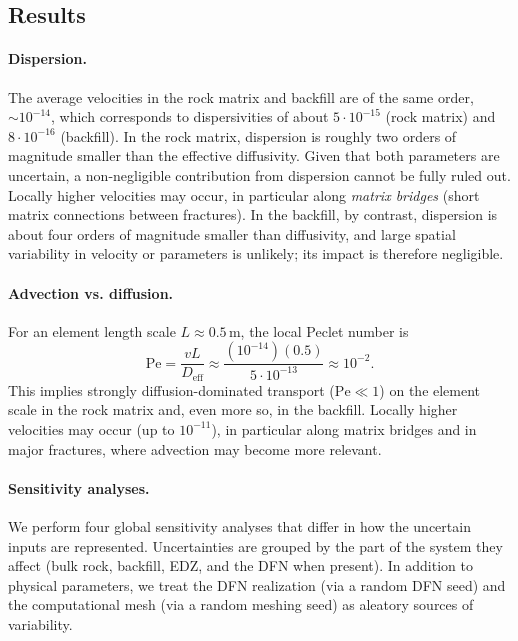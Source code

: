 \FloatBarrier







\subsection{Results}

\paragraph{Dispersion.}
The average velocities in the rock matrix and backfill are of the same order, $\sim 10^{-14}$, which corresponds to dispersivities of about $5\cdot 10^{-15}$ (rock matrix) and $8\cdot 10^{-16}$ (backfill). In the rock matrix, dispersion is roughly two orders of magnitude smaller than the effective diffusivity. 
Given that both parameters are uncertain, a non-negligible contribution from dispersion cannot be fully ruled out. Locally higher velocities may occur, in particular along \emph{matrix bridges} (short matrix connections between fractures).
In the backfill, by contrast, dispersion is about four orders of magnitude smaller than diffusivity, and large spatial variability in velocity or parameters is unlikely; its impact is therefore negligible.

\paragraph{Advection vs. diffusion.}
For an element length scale $L \approx 0.5\,\mathrm{m}$, the local Peclet number is
\[
\mathrm{Pe}=\frac{vL}{D_{\mathrm{eff}}}\approx \frac{(10^{-14})(0.5)}{5\cdot 10^{-13}} \approx 10^{-2}.
\]
This implies strongly diffusion-dominated transport ($\mathrm{Pe}\ll 1$) on the element scale in the rock matrix and, even more so, in the backfill. Locally higher velocities may occur (up to $10^{-11}$), in particular along matrix bridges and in major fractures, where advection may become more relevant.

\paragraph{Sensitivity analyses.}
We perform four global sensitivity analyses that differ in how the uncertain inputs are represented. Uncertainties are grouped by the part of the system they affect (bulk rock, backfill, EDZ, and the DFN when present). In addition to physical parameters, we treat the DFN realization (via a random DFN seed) and the computational mesh (via a random meshing seed) as aleatory sources of variability.

